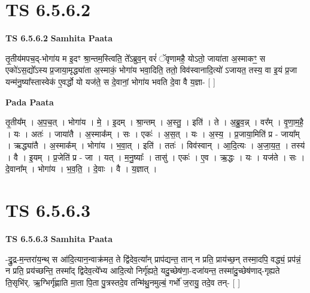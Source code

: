\documentclass[17pt]{extarticle}
\begin{document}

\section{ TS 6.5.6.2 }

\textbf{TS 6.5.6.2 } \newline
\textbf{Samhita Paata} \newline

तृ॒तीय॑मपच॒द्-भोगा॑य म इ॒दꣳ श्रा॒न्तम॒स्त्विति॒ ते᳚ऽब्रुव॒न् वरं॑ ॅवृणामहै॒ योऽतो॒ जाया॑ता अ॒स्माकꣳ॒॒ स एको॑ऽस॒द्यो᳚ऽस्य प्र॒जाया॒मृद्ध्या॑ता अ॒स्माकं॒ भोगा॑य भवा॒दिति॒ ततो॒ विव॑स्वानादि॒त्यो॑ ऽजायत॒ तस्य॒ वा इ॒यं प्र॒जा यन्म॑नु॒ष्या᳚स्तास्वेक॑ ए॒वर्द्धो यो यज॑ते॒ स दे॒वानां॒ भोगा॑य भवति दे॒वा वै य॒ज्ञा- [  ] \newline

\textbf{Pada Paata} \newline

तृ॒तीय᳚म् । अ॒प॒च॒त् । भोगा॑य । मे॒ । इ॒दम् । श्रा॒न्तम् । अ॒स्तु॒ । इति॑ । ते । अ॒ब्रु॒व॒न्न् । वर᳚म् । वृ॒णा॒म॒है॒ । यः । अतः॑ । जाया॑तै । अ॒स्माक᳚म् । सः । एकः॑ । अ॒स॒त् । यः । अ॒स्य॒ । प्र॒जाया॒मिति॑ प्र - जाया᳚म् । ऋद्ध्या॑तै । अ॒स्माक᳚म् । भोगा॑य । भ॒वा॒त् । इति॑ । ततः॑ । विव॑स्वान् । आ॒दि॒त्यः । अ॒जा॒य॒त॒ । तस्य॑ । वै । इ॒यम् । प्र॒जेति॑ प्र - जा । यत् । म॒नु॒ष्याः᳚ । तासु॑ । एकः॑ । ए॒व । ऋ॒द्धः । यः । यज॑ते । सः । दे॒वाना᳚म् । भोगा॑य । भ॒व॒ति॒ । दे॒वाः । वै । य॒ज्ञात् ।  \newline





\section{ TS 6.5.6.3 }

\textbf{TS 6.5.6.3 } \newline
\textbf{Samhita Paata} \newline

-द्रु॒द्र-म॒न्तरा॑य॒न्थ् स आ॑दि॒त्यान॒न्वाक्र॑मत॒ ते द्वि॑देव॒त्या᳚न् प्राप॑द्यन्त॒ तान् न प्रति॒ प्राय॑च्छ॒न् तस्मा॒दपि॒ वद्ध्यं॒ प्रप॑न्नं॒ न प्रति॒ प्रय॑च्छन्ति॒ तस्मा᳚द् द्विदेव॒त्ये᳚भ्य आदि॒त्यो निर्गृ॑ह्यते॒ यदु॒च्छेष॑णा॒-दजा॑यन्त॒ तस्मा॑दु॒च्छेष॑णाद्-गृह्यते ति॒सृभि॑र्. ऋ॒ग्भिर्गृ॑ह्णाति मा॒ता पि॒ता पु॒त्रस्तदे॒व तन्मि॑थु॒नमुल्बं॒ गर्भो॑ ज॒रायु॒ तदे॒व तन्- [  ] \newline
\end{document}
